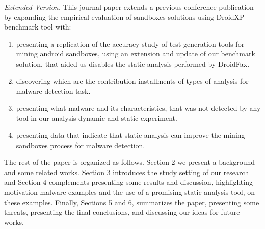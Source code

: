 \textit{Extended Version.} This journal paper extends a previous conference publication~\cite{DBLP:conf/scam/CostaMCMVBC20} by expanding the empirical evaluation of sandboxes solutions using DroidXP benchmark tool with:
 \begin{enumerate}[(1)]
  \item presenting a replication of the accuracy study of test generation tools for mining android sandboxes, using an extension and update of our benchmark solution, that aided us disables the static analysis performed by DroidFax.
 
  \item discovering which are the contribution installments of types of analysis for malware detection task.
 
  \item presenting what malware and its characteristics, that was not detected by any tool in our analysis dynamic and static experiment.
 
  \item presenting data that indicate that static analysis can improve the mining sandboxes process for malware detection.
  \end{enumerate}

The rest of the paper is organized as follows. Section 2 we present a background and some related works. Section 3 introduces the study setting of our research and Section 4 complements presenting some results and discussion, highlighting motivation malware examples and the use of a promising static analysis tool, on these examples. Finally, Sections 5 and 6, summarizes the paper, presenting some threats, presenting the final conclusions, and discussing our ideas for future works.



 
 
 
